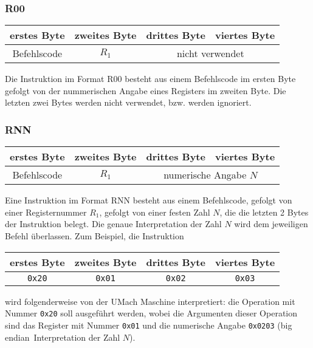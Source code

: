 \subsubsection{R00}
\label{R00}

\begin{center}
  \begin{tabular}{|*{4}{c|}} \hline
    erstes Byte & zweites Byte  & drittes Byte  & viertes Byte   \\\hline\hline
    Befehlscode & $R_{1}$ & \multicolumn{2}{c|}{nicht verwendet} \\\hline
  \end{tabular}
\end{center}
Die Instruktion im Format R00 besteht aus einem Befehlscode im ersten Byte
gefolgt von der nummerischen Angabe eines Registers im zweiten Byte. Die letzten
zwei Bytes werden nicht verwendet, bzw. werden ignoriert.

\subsubsection{RNN}
\label{RNN}

\begin{center}
  \begin{tabular}{|*{4}{c|}} \hline
    erstes Byte & zweites Byte  & drittes Byte  & viertes Byte   \\\hline\hline
    Befehlscode & $R_{1}$ & \multicolumn{2}{c|}{numerische Angabe $N$}
\\\hline
  \end{tabular}
\end{center}

Eine Instruktion im Format RNN besteht aus einem Befehlscode, gefolgt von einer
Registernummer $R_{1}$, gefolgt von einer festen Zahl $N$, die die letzten 2
Bytes der Instruktion belegt. Die genaue Interpretation der Zahl $N$ wird dem
jeweiligen Befehl überlassen. Zum Beispiel, die Instruktion
\begin{center}
  \begin{tabular}{|*{4}{c|}} \hline
    erstes Byte & zweites Byte  & drittes Byte  & viertes Byte \\\hline\hline
    \texttt{0x20} & \texttt{0x01} & \texttt{0x02} & \texttt{0x03} \\\hline
  \end{tabular}
\end{center}
wird folgenderweise von der UMach Maschine interpretiert: die Operation mit
Nummer \texttt{0x20} soll ausgeführt werden, wobei die Argumenten dieser
Operation sind das Register mit Nummer \texttt{0x01} und die numerische
Angabe \texttt{0x0203} (\glqq big endian\grqq\ Interpretation der Zahl $N$).



